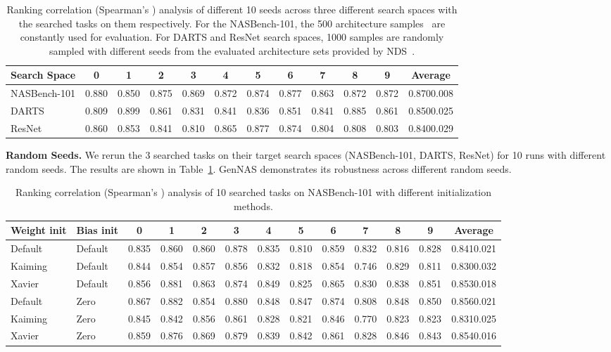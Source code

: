 \documentclass{article}
\begin{document}
\begin{table}[h]
  \caption{Ranking correlation (Spearman's ) analysis of different 10 seeds across three different search spaces with the searched tasks on them respectively. For the NASBench-101, the 500 architecture samples~\cite{liu2020labels} are constantly used for evaluation. For DARTS and ResNet search spaces, 1000 samples are randomly sampled with different seeds from the evaluated architecture sets provided by NDS~\cite{radosavovic2019network}.}\label{table:seed}
  \centering
  \scriptsize
\begin{tabular}{lccccccccccc}
\toprule
Search Space & 0 & 1 & 2 & 3 & 4 & 5 & 6 & 7 & 8 & 9 & Average\\\midrule
 NASBench-101& 0.880 &0.850 & 0.875 & 0.869 & 0.872 & 0.874 & 0.877 & 0.863 & 0.872 & 0.872 & 0.8700.008\\
 DARTS  & 0.809 & 0.899 & 0.861 & 0.831 & 0.841 & 0.836 & 0.851 & 0.841 & 0.885 & 0.861& 0.8500.025\\
 ResNet&  0.860 & 0.853 & 0.841 & 0.810 & 0.865 & 0.877 & 0.874 & 0.804 & 0.808 & 0.803 & 0.8400.029\\\bottomrule
\end{tabular}
\end{table}

\textbf{Random Seeds.}
We rerun the 3 searched tasks on their target search spaces (NASBench-101, DARTS, ResNet) for 10 runs with different random seeds. The results are shown in Table~\ref{table:seed}. GenNAS demonstrates its robustness across different random seeds.

\begin{table}[b]
  \caption{Ranking correlation (Spearman's ) analysis of 10 searched tasks on NASBench-101 with different initialization methods.}\label{table:initialization}
  \centering
  \tiny
\begin{tabular}{llccccccccccc}
\toprule
Weight init&Bias init& 0 & 1 & 2 & 3 & 4 & 5 & 6 & 7 & 8 & 9 & Average\\\midrule
 Default& Default& 0.835 &0.860 & 0.860 & 0.878 & 0.835 & 0.810 & 0.859 & 0.832 & 0.816 & 0.828 & 0.8410.021\\
 Kaiming  & Default&0.844 & 0.854 & 0.857 & 0.856 & 0.832 & 0.818 & 0.854 & 0.746 & 0.829 & 0.811& 0.8300.032\\
 Xavier&  Default&0.856 & 0.881 & 0.863 & 0.874 & 0.849 & 0.825 & 0.865 & 0.830 & 0.838 & 0.851 & 0.8530.018\\
 Default& Zero&0.867 &0.882 & 0.854 & 0.880 & 0.848 & 0.847 & 0.874 & 0.808 & 0.848 & 0.850 & 0.8560.021\\
 Kaiming  & Zero&0.845 & 0.842 & 0.856 & 0.861 & 0.828 & 0.821 & 0.846 & 0.770 & 0.823 & 0.823& 0.8310.025\\
 Xavier&  Zero&0.859 & 0.876 & 0.869 & 0.879 & 0.839 & 0.842 & 0.861 & 0.828 & 0.846 & 0.843& 0.8540.016\\
 \bottomrule
\end{tabular}
\end{table}
\end{document}
